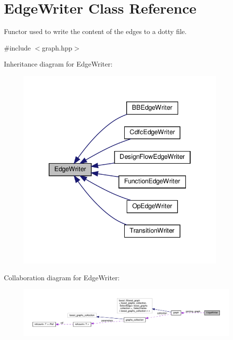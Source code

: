\hypertarget{classEdgeWriter}{}\section{Edge\+Writer Class Reference}
\label{classEdgeWriter}


Functor used to write the content of the edges to a dotty file.  




{\ttfamily \#include $<$graph.\+hpp$>$}



Inheritance diagram for Edge\+Writer\+:
\nopagebreak
\begin{figure}[H]
\begin{center}
\leavevmode
\includegraphics[width=298pt]{dc/dd4/classEdgeWriter__inherit__graph}
\end{center}
\end{figure}


Collaboration diagram for Edge\+Writer\+:
\nopagebreak
\begin{figure}[H]
\begin{center}
\leavevmode
\includegraphics[width=350pt]{db/de8/classEdgeWriter__coll__graph}
\end{center}
\end{figure}
